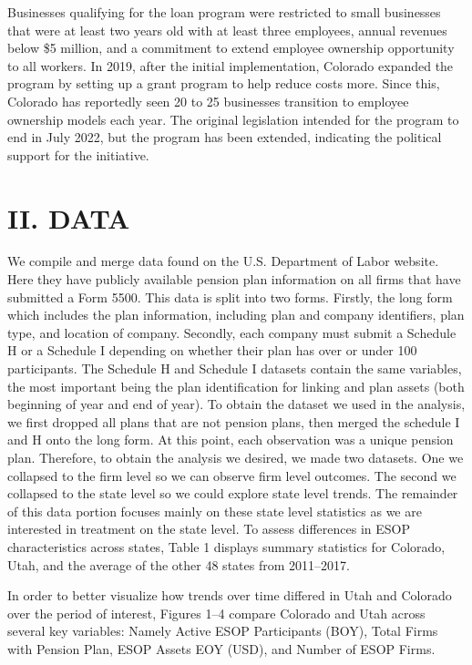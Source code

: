 \documentclass[12pt]{article}
\renewcommand{\normalsize}{\fontsize{12pt}{14pt}\selectfont}
\begin{document}
Businesses qualifying for the loan program were restricted to small businesses that were at least two years old with at least three employees, annual revenues below \$5 million, and a commitment to extend employee ownership opportunity to all workers. In 2019, after the initial implementation, Colorado expanded the program by setting up a grant program to help reduce costs more. Since this, Colorado has reportedly seen 20 to 25 businesses transition to employee ownership models each year. The original legislation intended for the program to end in July 2022, but the program has been extended, indicating the political support for the initiative.

\section*{\centering \normalsize \textbf{II. DATA}}

We compile and merge data found on the U.S. Department of Labor website. Here they have publicly available pension plan information on all firms that have submitted a Form 5500. This data is split into two forms. Firstly, the long form which includes the plan information, including plan and company identifiers, plan type, and location of company. Secondly, each company must submit a Schedule H or a Schedule I depending on whether their plan has over or under 100 participants. The Schedule H and Schedule I datasets contain the same variables, the most important being the plan identification for linking and plan assets (both beginning of year and end of year). To obtain the dataset we used in the analysis, we first dropped all plans that are not pension plans, then merged the schedule I and H onto the long form. At this point, each observation was a unique pension plan. Therefore, to obtain the analysis we desired, we made two datasets. One we collapsed to the firm level so we can observe firm level outcomes. The second we collapsed to the state level so we could explore state level trends. The remainder of this data portion focuses mainly on these state level statistics as we are interested in treatment on the state level. To assess differences in ESOP characteristics across states, Table 1 displays summary statistics for Colorado, Utah, and the average of the other 48 states from 2011--2017.




 In order to better visualize how trends over time differed in Utah and Colorado over the period of interest, Figures 1--4 compare Colorado and Utah across several key variables: Namely Active ESOP Participants (BOY), Total Firms with Pension Plan, ESOP Assets EOY (USD), and Number of ESOP Firms.
\end{document}
